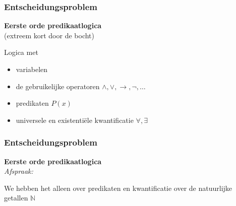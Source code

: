 \documentclass[handout]{beamer}
\begin{document}
\begin{frame}
    \frametitle{Entscheidungsproblem}
    \textbf{Eerste orde predikaatlogica} \\
    (extreem kort door de bocht) 
    \bigskip
    
    Logica met
    \begin{itemize}
        \item<2-> variabelen
        \item<3-> de gebruikelijke operatoren $\wedge, \vee, \rightarrow, \neg, \ldots$
        \item<4-> predikaten $P(x)$
        \item<5-> universele en existentiële kwantificatie $\forall, \exists$
    \end{itemize}

\end{frame}

\begin{frame}
    \frametitle{Entscheidungsproblem}
    \textbf{Eerste orde predikaatlogica} \\

    \emph{Afspraak:}

    We hebben het alleen over predikaten en kwantificatie over de natuurlijke getallen $\mathbb{N}$

    \vspace{1cm}

    

    \vspace{1cm}
\end{frame}
\end{document}
